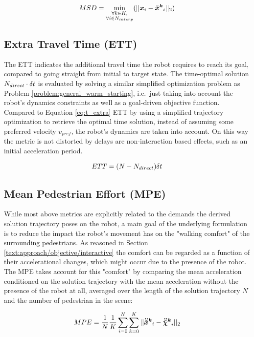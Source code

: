\begin{equation}
MSD = \min_{\substack{\forall k \in K, \\ \forall i \in \stepssolution_{interp}}}(||\x_i - \xped[k]_i||_2) 
\end{equation}

\subsection{Extra Travel Time (ETT)}
The ETT indicates the additional travel time the robot requires to reach its goal, compared to going straight from initial to target state. The time-optimal solution $N_{direct} \cdot \delta t$ is evaluated by solving a similar simplified optimization problem as Problem \ref{problem:general_warm_starting}, i.e.\ just taking into account the robot's dynamics constraints as well as a goal-driven objective function. Compared to Equation \ref{eq:t_extra} ETT by using a simplified trajectory optimization to retrieve the optimal time solution, instead of assuming some preferred velocity $v_{pref}$, the robot's dynamics are taken into account. On this way the metric is not distorted by delays are non-interaction based effects, such as an initial acceleration period.  

\begin{equation}
ETT = (N - N_{direct})\delta t
\end{equation} 

\subsection{Mean Pedestrian Effort (MPE)}
While most above metrics are explicitly related to the demands the derived solution trajectory poses on the robot, a main goal of the underlying formulation is to reduce the impact the robot's movement has on the "walking comfort" of the surrounding pedestrians. As reasoned in Section \ref{text:approach/objective/interactive} the comfort can be regarded as a function of their accelerational changes, which might occur due to the presence of the robot. The MPE takes account for this "comfort" by comparing the mean acceleration conditioned on the solution trajectory with the mean acceleration without the presence of the robot at all, averaged over the length of the solution trajectory $N$ and the number of pedestrian in the scene:

\begin{equation}
MPE = \frac{1}{\stepssolution} \frac{1}{K} \sum_{i=0}^{\stepssolution} \sum_{k=0}^K ||\ddxped[k]_i - \ddxpedwo[k]_i||_2
\end{equation}

